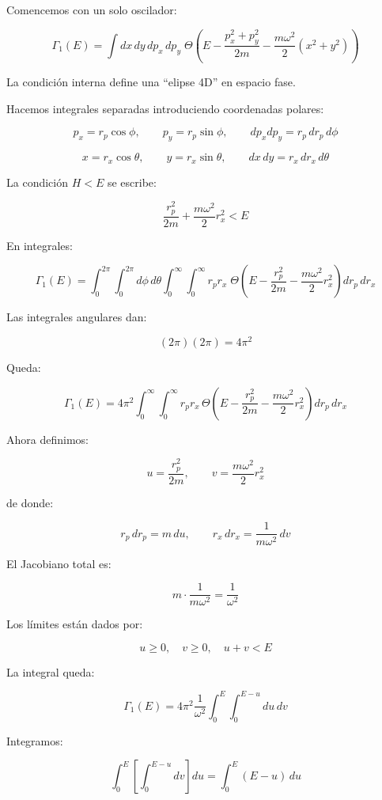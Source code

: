 \documentclass{article}
\begin{document}
Comencemos con un solo oscilador:

\[
\Gamma_{1}(E)
=
\int dx\,dy\,dp_{x}\,dp_{y}\;
\Theta\!\left(
E - \frac{p_{x}^{2}+p_{y}^{2}}{2m}
     -\frac{m\omega^{2}}{2}(x^{2}+y^{2})
\right)
\]

La condición interna define una “elipse 4D” en espacio fase.

Hacemos integrales separadas introduciendo coordenadas polares:

\[
p_{x} = r_{p}\cos\phi,\qquad
p_{y} = r_{p}\sin\phi,
\qquad
dp_{x}dp_{y}= r_{p}\,dr_{p}\,d\phi
\]

\[
x = r_{x}\cos\theta,\qquad
y = r_{x}\sin\theta,
\qquad
dx\,dy = r_{x}\,dr_{x}\,d\theta
\]

La condición \(H<E\) se escribe:

\[
\frac{r_{p}^{2}}{2m} + \frac{m\omega^{2}}{2}r_{x}^{2} < E
\]

En integrales:

\[
\Gamma_{1}(E)
=
\int_{0}^{2\pi}\!\!\int_{0}^{2\pi}
d\phi\,d\theta
\int_{0}^{\infty}\!\!\int_{0}^{\infty}
r_{p} r_{x}
\;
\Theta\!\left(
E - \frac{r_{p}^{2}}{2m} - \frac{m\omega^{2}}{2}r_{x}^{2}
\right)
dr_{p}\,dr_{x}
\]

Las integrales angulares dan:

\[
(2\pi)(2\pi)=4\pi^{2}
\]

Queda:

\[
\Gamma_{1}(E)
=
4\pi^{2}
\int_{0}^{\infty}\!\!\int_{0}^{\infty}
r_{p}r_{x}\,
\Theta\!\left(
E - \frac{r_{p}^{2}}{2m} - \frac{m\omega^{2}}{2}r_{x}^{2}
\right)
dr_{p}\,dr_{x}
\]

Ahora definimos:

\[
u = \frac{r_{p}^{2}}{2m},
\qquad
v = \frac{m\omega^{2}}{2}r_{x}^{2}
\]

de donde:

\[
r_{p}\,dr_{p} = m\,du,
\qquad
r_{x}\,dr_{x} = \frac{1}{m\omega^{2}}\,dv
\]

El Jacobiano total es:

\[
m\cdot \frac{1}{m\omega^{2}} = \frac{1}{\omega^{2}}
\]

Los límites están dados por:

\[
u\ge 0,\quad v\ge 0,\quad u+v<E
\]

La integral queda:

\[
\Gamma_{1}(E)
=
4\pi^{2}
\frac{1}{\omega^{2}}
\int_{0}^{E}\!\!\int_{0}^{E-u}
du\,dv
\]

Integramos:

\[
\int_{0}^{E}\left[
\int_{0}^{E-u} dv
\right]du
=
\int_{0}^{E} (E-u)\,du
\]
\end{document}
